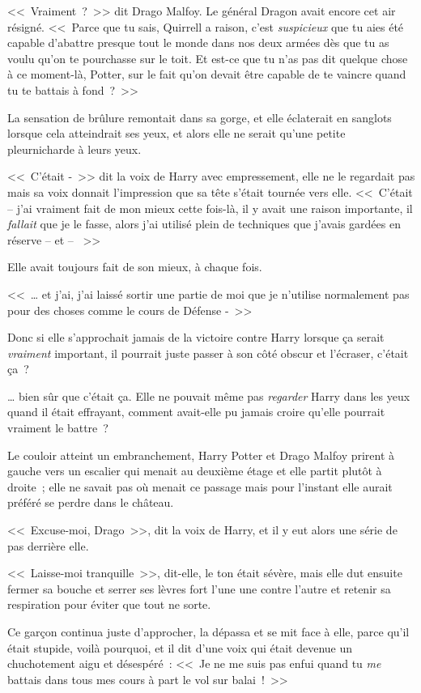 <<~Vraiment~?~>> dit Drago Malfoy. Le général Dragon avait encore cet air résigné. <<~Parce que tu sais, Quirrell a raison, c'est \emph{suspicieux} que tu aies été capable d'abattre presque tout le monde dans nos deux armées dès que tu as voulu qu'on te pourchasse sur le toit. Et est-ce que tu n'as pas dit quelque chose à ce moment-là, Potter, sur le fait qu'on devait être capable de te vaincre quand tu te battais à fond~?~>>

La sensation de brûlure remontait dans sa gorge, et elle éclaterait en sanglots lorsque cela atteindrait ses yeux, et alors elle ne serait qu'une petite pleurnicharde à leurs yeux.

<<~C'était -~>> dit la voix de Harry avec empressement, elle ne le regardait pas mais sa voix donnait l'impression que sa tête s'était tournée vers elle. <<~C'était -- j'ai vraiment fait de mon mieux cette fois-là, il y avait une raison importante, il \emph{fallait} que je le fasse, alors j'ai utilisé plein de techniques que j'avais gardées en réserve -- et -- ~>>

Elle avait toujours fait de son mieux, à chaque fois.

<<~… et j'ai, j'ai laissé sortir une partie de moi que je n'utilise normalement pas pour des choses comme le cours de Défense -~>>

Donc si elle s'approchait jamais de la victoire contre Harry lorsque ça serait \emph{vraiment} important, il pourrait juste passer à son côté obscur et l'écraser, c'était ça~?

… bien sûr que c'était ça. Elle ne pouvait même pas \emph{regarder} Harry dans les yeux quand il était effrayant, comment avait-elle pu jamais croire qu'elle pourrait vraiment le battre~?

Le couloir atteint un embranchement, Harry Potter et Drago Malfoy prirent à gauche vers un escalier qui menait au deuxième étage et elle partit plutôt à droite~; elle ne savait pas où menait ce passage mais pour l'instant elle aurait préféré se perdre dans le château.

<<~Excuse-moi, Drago~>>, dit la voix de Harry, et il y eut alors une série de pas derrière elle.

<<~Laisse-moi tranquille~>>, dit-elle, le ton était sévère, mais elle dut ensuite fermer sa bouche et serrer ses lèvres fort l'une une contre l'autre et retenir sa respiration pour éviter que tout ne sorte.

Ce garçon continua juste d'approcher, la dépassa et se mit face à elle, parce qu'il était stupide, voilà pourquoi, et il dit d'une voix qui était devenue un chuchotement aigu et désespéré~: <<~Je ne me suis pas enfui quand tu \emph{me} battais dans tous mes cours à part le vol sur balai~!~>>

